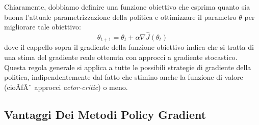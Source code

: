 ﻿\documentclass[11pt, a4paper]{report}
\begin{document}
Chiaramente, dobbiamo definire una funzione obiettivo che esprima quanto sia buona l'attuale parametrizzazione della politica e ottimizzare il parametro $\theta$ per migliorare tale obiettivo:
\begin{equation}
\theta_{t+1} = \theta_t + \alpha \nabla \hat{J}(\theta_t)
\end{equation}
dove il cappello sopra il gradiente della funzione obiettivo indica che si tratta di una stima del gradiente reale ottenuta con approcci a gradiente stocastico. Questa regola generale si applica a tutte le possibili strategie di gradiente della politica, indipendentemente dal fatto che stimino anche la funzione di valore (cioÃƒÂ¨ approcci \emph{actor-critic}) o meno.

\subsection{Vantaggi Dei Metodi Policy Gradient}
\end{document}
